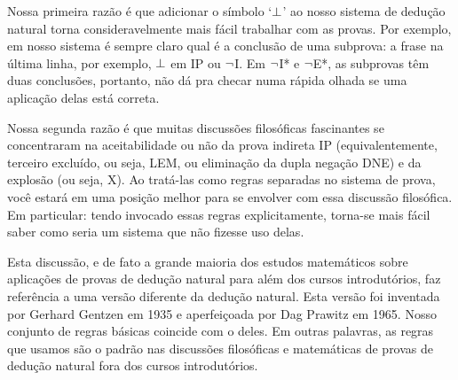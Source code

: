 Nossa primeira razão é que adicionar o símbolo `$\bot$' ao nosso sistema de dedução natural torna consideravelmente mais fácil trabalhar com as provas. Por exemplo, em nosso sistema é sempre claro qual é a conclusão de uma subprova: a frase na última linha, por exemplo, $\bot$ em IP ou $\neg$I. Em $\neg$I* e $\neg$E*, as subprovas têm duas conclusões, portanto, não dá pra checar numa rápida olhada se uma aplicação delas está correta.

Nossa segunda razão é que muitas discussões filosóficas fascinantes se concentraram na aceitabilidade ou não da prova indireta IP (equivalentemente, terceiro excluído, ou seja, LEM, ou eliminação da dupla negação DNE) e da explosão (ou seja, X). Ao tratá-las como regras separadas no sistema de prova, você estará em uma posição melhor para se envolver com essa discussão filosófica. Em particular: tendo invocado essas regras explicitamente, torna-se mais fácil saber como seria um sistema que não fizesse uso delas.

Esta discussão, e de fato a grande maioria dos estudos matemáticos sobre aplicações de provas de dedução natural para além dos cursos introdutórios, faz referência a uma versão diferente da dedução natural. Esta versão foi inventada por Gerhard Gentzen em 1935 e aperfeiçoada por Dag Prawitz em 1965. Nosso conjunto de regras básicas coincide com o deles. Em outras palavras, as regras que usamos são o padrão nas discussões filosóficas e matemáticas de provas de dedução natural fora dos cursos introdutórios. 


